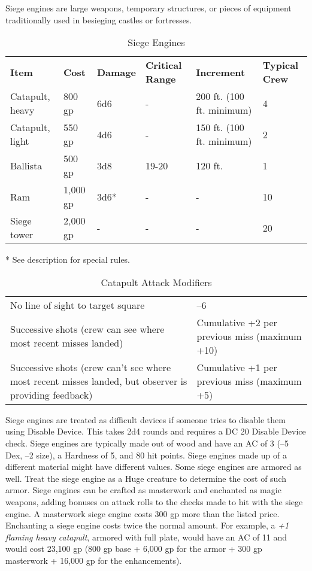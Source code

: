 				
Siege engines are large weapons, temporary structures, or pieces of equipment traditionally used in besieging castles or fortresses.

\begin{table}[]
\sffamily
\caption{Siege Engines}
\begin{tabular}{llllll}
\textbf{Item} & \textbf{Cost} & \textbf{Damage} & \textbf{Critical Range} & \textbf{Increment} & \textbf{Typical Crew}\\
Catapult, heavy & 800 gp & 6d6 & - & 200 ft. (100 ft. minimum) & 4\\
Catapult, light & 550 gp & 4d6 & - & 150 ft. (100 ft. minimum) & 2\\
Ballista & 500 gp & 3d8 & 19-20 & 120 ft. & 1\\
Ram & 1,000 gp & 3d6* & - & - & 10\\
Siege tower & 2,000 gp & - & - & - & 20\\
\end{tabular}
* See description for special rules.\\
\end{table}

\begin{table}
 \sffamily
 \caption{Catapult Attack Modifiers}
 \begin{tabular}{ll}
No line of sight to target square & --6\\
Successive shots (crew can see where most recent misses landed) & Cumulative +2 per previous miss (maximum +10)\\
Successive shots (crew can't see where most recent misses landed, but observer is providing feedback) & Cumulative +1 per previous miss (maximum +5)\\
 \end{tabular}

\end{table}

				
Siege engines are treated as difficult devices if someone tries to disable them using Disable Device. This takes 2d4 rounds and requires a DC 20 Disable Device check. Siege engines are typically made out of wood and have an AC of 3 (--5 Dex, --2 size), a Hardness of 5, and 80 hit points. Siege engines made up of a different material might have different values. Some siege engines are armored as well. Treat the siege engine as a Huge creature to determine the cost of such armor. Siege engines can be crafted as masterwork and enchanted as magic weapons, adding bonuses on attack rolls to the checks made to hit with the siege engine. A masterwork siege engine costs 300 gp more than the listed price. Enchanting a siege engine costs twice the normal amount. For example, a \textit{+1 flaming heavy catapult}, armored with full plate, would have an AC of 11 and would cost 23,100 gp (800 gp base + 6,000 gp for the armor + 300 gp masterwork + 16,000 gp for the enhancements).
				
